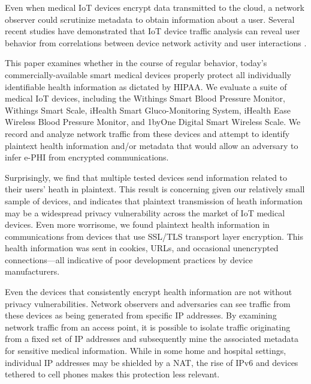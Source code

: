 Even when medical IoT devices encrypt data transmitted to the cloud, a network observer could scrutinize metadata to obtain information about a user.  Several recent studies have demonstrated that IoT device traffic analysis can reveal user behavior  from correlations between device network activity and user interactions \cite{apthorpeIoT}.  

This paper examines whether in the course of regular behavior, today's commercially-available smart medical devices properly protect all individually identifiable health information as dictated by HIPAA.  We evaluate a suite of medical IoT devices, including the Withings Smart Blood Pressure Monitor, Withings Smart Scale, iHealth Smart Gluco-Monitoring System, iHealth Ease Wireless Blood Pressure Monitor, and 1byOne Digital Smart Wireless Scale.  We record and analyze network traffic from these devices and attempt to identify plaintext health information and/or metadata that would allow an adversary to infer e-PHI from encrypted communications.  

Surprisingly, we find that multiple tested devices send information related to their users' heath in plaintext.  This result is concerning given our relatively small sample of devices, and indicates that plaintext transmission of heath information may be a widespread privacy vulnerability across the market of IoT medical devices. Even more worrisome, we found plaintext health information in communications from devices that use SSL/TLS transport layer encryption. This health information was sent in cookies, URLs, and occasional unencrypted connections---all indicative of poor development practices by device manufacturers. 

Even the devices that consistently encrypt health information are not without privacy vulnerabilities.  Network observers and adversaries can see traffic from these devices as being generated from specific IP addresses. By examining network traffic from an access point, it is possible to isolate traffic originating from a fixed set of IP addresses and subsequently mine the associated metadata for sensitive medical information. While in some home and hospital settings, individual IP addresses may be shielded by a NAT, the rise of IPv6 and devices tethered to cell phones makes this protection less relevant. 

